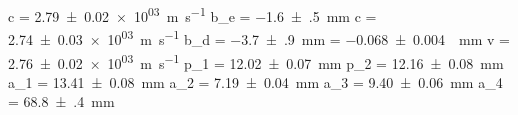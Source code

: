 c = \SI{+2.79(2)e+03}{\meter\per\second}
b_e = \SI{-1.6(5)}{\milli\meter}
c = \SI{+2.74(3)e+03}{\meter\per\second}
b_d = \SI{-3.7(9)}{\milli\meter}
\alpha = \SI{-0.068(4)}{\per\milli\meter}
v = \SI{+2.76(2)e+03}{\meter\per\second}
p_1 = \SI{+12.02(7)}{\milli\meter}
p_2 = \SI{+12.16(8)}{\milli\meter}
a_1 = \SI{+13.41(8)}{\milli\meter}
a_2 = \SI{+7.19(4)}{\milli\meter}
a_3 = \SI{+9.40(6)}{\milli\meter}
a_4 = \SI{+68.8(4)}{\milli\meter}
